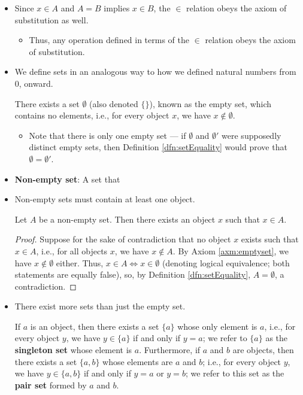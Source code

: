 \documentclass[../main.tex]{subfiles}
\begin{document}
\begin{itemize}
    \item {}Since $x\in A$ and $A=B$ implies $x\in B$, the $\in$ relation obeys the axiom of substitution as well.
    \begin{itemize}
        \item Thus, any operation defined in terms of the $\in$ relation obeys the axiom of substitution.
    \end{itemize}
    \item We define sets in an analogous way to how we defined natural numbers from 0, onward.
    \begin{axm}\label{axm:emptyset}
        There exists a set $\emptyset$ \textup{(}also denoted $\{\}$\textup{)}, known as the empty set, which contains no elements, i.e., for every object $x$, we have $x\notin\emptyset$.
    \end{axm}
    \begin{itemize}
        \item Note that there is only one empty set --- if $\emptyset$ and $\emptyset'$ were supposedly distinct empty sets, then Definition \ref{dfn:setEquality} would prove that $\emptyset=\emptyset'$.
    \end{itemize}
    \item \textbf{Non-empty set}: A set that 
    \item Non-empty sets must contain at least one object.
    \begin{lem}
        Let $A$ be a non-empty set. Then there exists an object $x$ such that $x\in A$.
        \begin{proof}
            Suppose for the sake of contradiction that no object $x$ exists such that $x\in A$, i.e., for all objects $x$, we have $x\notin A$. By Axiom \ref{axm:emptyset}, we have $x\notin\emptyset$ either. Thus, $x\in A \Longleftrightarrow x\in\emptyset$ (denoting logical equivalence; both statements are equally false), so, by Definition \ref{dfn:setEquality}, $A=\emptyset$, a contradiction.
        \end{proof}
    \end{lem}
    \item There exist more sets than just the empty set.
    \begin{axm}\label{axm:singletonPair}
        If $a$ is an object, then there exists a set $\{a\}$ whose only element is $a$, i.e., for every object $y$, we have $y\in\{a\}$ if and only if $y=a$; we refer to $\{a\}$ as the \textbf{singleton set} whose element is $a$. Furthermore, if $a$ and $b$ are objects, then there exists a set $\{a,b\}$ whose elements are $a$ and $b$; i.e., for every object $y$, we have $y\in\{a,b\}$ if and only if $y=a$ or $y=b$; we refer to this set as the \textbf{pair set} formed by $a$ and $b$.

\end{axm}
\end{itemize}
\end{document}
